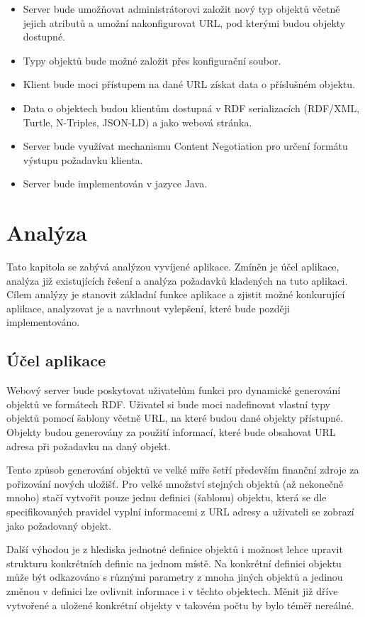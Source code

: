 \documentclass[thesis=B,czech]{FITthesis}[2012/06/26]
\begin{document}
 \begin{itemize}
  \item Server bude umožňovat administrátorovi založit nový typ objektů včetně jejich atributů a umožní nakonfigurovat URL, pod kterými budou objekty dostupné. 
  \item Typy objektů bude možné založit přes konfigurační soubor. 
  \item Klient bude moci přístupem na dané URL získat data o příslušném objektu. 
  \item Data o objektech budou klientům dostupná v RDF serializacích (RDF/XML, Turtle, N-Triples, JSON-LD) a jako webová stránka.
  \item Server bude využívat mechanismu Content Negotiation pro určení formátu výstupu požadavku klienta. 
  \item Server bude implementován v jazyce Java.
 \end{itemize}
\chapter{Analýza}

Tato kapitola se zabývá analýzou vyvíjené aplikace. Zmíněn je účel aplikace, analýza již existujících řešení a analýza požadavků kladených na tuto aplikaci.
Cílem analýzy je stanovit základní funkce aplikace a zjistit možné konkurující aplikace, analyzovat je a navrhnout vylepšení, které bude později implementováno.

\section{Účel aplikace}
Webový server bude poskytovat uživatelům funkci pro dynamické generování objektů ve formátech RDF.
Uživatel si bude moci nadefinovat vlastní typy objektů pomocí šablony včetně URL, na které budou dané objekty přístupné.
Objekty budou generovány za použití informací, které bude obsahovat URL adresa při požadavku na daný objekt.

Tento způsob generování objektů ve velké míře šetří především finanční zdroje za pořizování nových uložišť. Pro velké množství stejných objektů (až nekonečně mnoho)
stačí vytvořit pouze jednu definici (šablonu) objektu, která se dle specifikovaných pravidel vyplní informacemi z URL adresy a uživateli se zobrazí jako 
požadovaný objekt.

Další výhodou je z hlediska jednotné definice objektů i možnost lehce upravit strukturu konkrétních definic na jednom místě.
Na konkrétní definici objektu může být odkazováno s různými parametry z mnoha jiných objektů a jedinou změnou v definici lze ovlivnit informace i v těchto objektech.
Měnit již dříve vytvořené a uložené konkrétní objekty v takovém počtu by bylo téměř nereálné.
\end{document}

